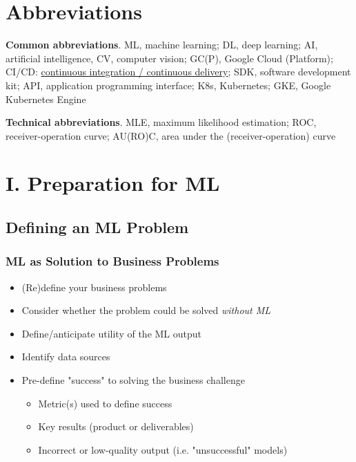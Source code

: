 \documentclass[10pt,landscape,letterpaper]{cheatsheet}
\begin{document}
\begin{multicols}{3}

\section{Abbreviations}

\textbf{Common abbreviations}. ML, machine learning; DL, deep learning; AI, artificial intelligence, CV, computer vision; GC(P), Google Cloud (Platform); CI/CD: \href{https://www.redhat.com/en/topics/devops/what-is-ci-cd}{continuous integration / continuous delivery}; SDK, software development kit; API, application programming interface; K8s, Kubernetes; GKE, Google Kubernetes Engine

\textbf{Technical abbreviations}. MLE, maximum likelihood estimation; ROC, receiver-operation curve; AU(RO)C, area under the (receiver-operation) curve

\section{I. Preparation for ML}

\subsection{Defining an ML Problem}

\subsubsection{ML as Solution to Business Problems}

\begin{itemize}
    \item (Re)define your business problems
    \item Consider whether the problem could be solved \emph{without ML}
    \item Define/anticipate utility of the ML output
    \item Identify data sources
    \item Pre-define "success" to solving the business challenge
    \begin{itemize}
        \item Metric(s) used to define success
        \item Key results (product or deliverables)
        \item Incorrect or low-quality output (i.e. "unsuccessful" models)
    \end{itemize}
\end{itemize}


\end{multicols}
\end{document}
